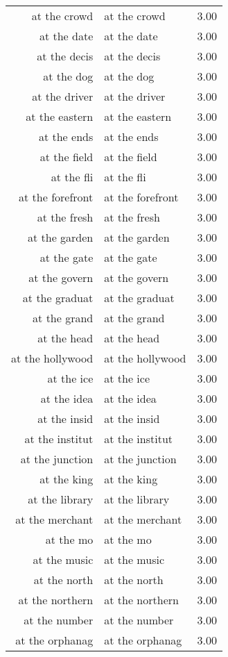 \begin{table}[ht]
\begin{tabular}{rlr}
  at the crowd & at the crowd & 3.00 \\ 
  at the date & at the date & 3.00 \\ 
  at the decis & at the decis & 3.00 \\ 
  at the dog & at the dog & 3.00 \\ 
  at the driver & at the driver & 3.00 \\ 
  at the eastern & at the eastern & 3.00 \\ 
  at the ends & at the ends & 3.00 \\ 
  at the field & at the field & 3.00 \\ 
  at the fli & at the fli & 3.00 \\ 
  at the forefront & at the forefront & 3.00 \\ 
  at the fresh & at the fresh & 3.00 \\ 
  at the garden & at the garden & 3.00 \\ 
  at the gate & at the gate & 3.00 \\ 
  at the govern & at the govern & 3.00 \\ 
  at the graduat & at the graduat & 3.00 \\ 
  at the grand & at the grand & 3.00 \\ 
  at the head & at the head & 3.00 \\ 
  at the hollywood & at the hollywood & 3.00 \\ 
  at the ice & at the ice & 3.00 \\ 
  at the idea & at the idea & 3.00 \\ 
  at the insid & at the insid & 3.00 \\ 
  at the institut & at the institut & 3.00 \\ 
  at the junction & at the junction & 3.00 \\ 
  at the king & at the king & 3.00 \\ 
  at the library & at the library & 3.00 \\ 
  at the merchant & at the merchant & 3.00 \\ 
  at the mo & at the mo & 3.00 \\ 
  at the music & at the music & 3.00 \\ 
  at the north & at the north & 3.00 \\ 
  at the northern & at the northern & 3.00 \\ 
  at the number & at the number & 3.00 \\ 
  at the orphanag & at the orphanag & 3.00 \\ 

\end{tabular}
\end{table}
